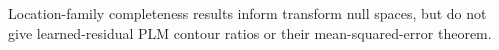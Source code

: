 Location-family completeness results inform transform null spaces, but do not give learned-residual PLM contour ratios or their mean-squared-error theorem.